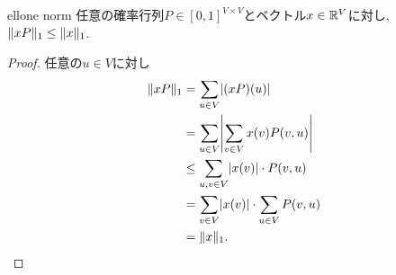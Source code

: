\begin{lemma}{}{ellone norm}
  任意の確率行列$P\in[0,1]^{V\times V}$とベクトル$x\in\mathbb{R}^V$に対し,
  $\lVert xP\rVert_{1} \le \lVert x\rVert_{1}$.
\end{lemma}
\begin{proof}
  任意の$u\in V$に対し
  \begin{align*}
    \norm{xP}_1 &= \sum_{u\in V} \abs*{(xP)(u)} \\
    &= \sum_{u\in V} \abs*{ \sum_{v\in V} x(v) P(v,u) } \\
    &\le \sum_{u,v\in V}\abs{x(v)}\cdot P(v,u) \\
    &= \sum_{v\in V}\abs{x(v)}\cdot \sum_{u\in V}P(v,u) \\
    &= \norm{x}_1.
  \end{align*}
\end{proof}
